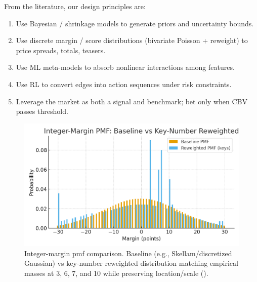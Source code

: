 From the literature, our design principles are:
\begin{enumerate}
  \item Use Bayesian / shrinkage models to generate priors and uncertainty bounds.
  \item Use discrete margin / score distributions (bivariate Poisson + reweight) to price spreads, totals, teasers.
  \item Use ML meta-models to absorb nonlinear interactions among features.
  \item Use RL to convert edges into action sequences under risk constraints.
  \item Leverage the market as both a signal and benchmark; bet only when CBV passes threshold.
\end{enumerate}

\bigskip
\begin{figure}[t]
  \centering
  \includegraphics[width=\linewidth]{../figures/key_number_pmf.png}
  \caption[Integer‑margin pmf comparison]{Integer-margin pmf comparison. Baseline (e.g., Skellam/discretized Gaussian) vs key-number reweighted distribution matching empirical masses at 3, 6, 7, and 10 while preserving location/scale ().}
  \label{fig:key-pmf}
\end{figure}

